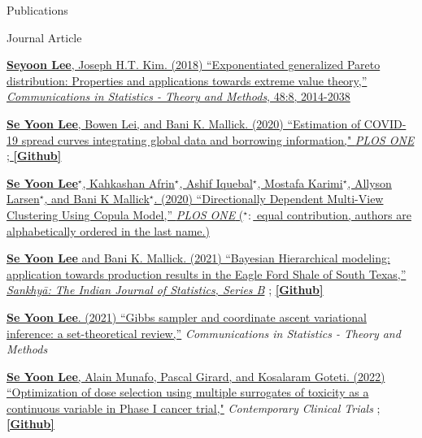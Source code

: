 \documentclass[
	11pt, %
]{resume} %
\begin{document}
\begin{rSection}{Publications}
\begin{rSubsection}{Journal Article}{}{}{}
\item[] [1] \href{https://www.tandfonline.com/doi/pdf/10.1080/03610926.2018.1441418?needAccess=true}
{\underline{\textbf{Seyoon Lee}}, Joseph H.T. Kim. (2018) ``Exponentiated generalized Pareto distribution:
Properties and applications towards extreme
value theory,''
\textit{Communications in Statistics - Theory and Methods},
 48:8, 2014-2038}
\item[] [2] \href{https://journals.plos.org/plosone/article?id=10.1371/journal.pone.0236860}
{\underline{\textbf{Se Yoon Lee}}, Bowen Lei, and Bani K. Mallick. (2020)
``Estimation of COVID-19 spread curves integrating global data and borrowing information," \textit{PLOS ONE}
;
\href{https://github.com/StevenBoys/BHRM}{\underline{\textbf{[Github]}}}
}
\item[] [3] 
\href{https://journals.plos.org/plosone/article?id=10.1371/journal.pone.0238996}
{\underline{\textbf{Se Yoon Lee}}$^\star$, Kahkashan Afrin$^\star$, Ashif Iquebal$^\star$, Mostafa Karimi$^\star$, Allyson Larsen$^\star$, and Bani K Mallick$^\star$. (2020)
``Directionally Dependent Multi-View Clustering Using Copula Model,'' \textit{PLOS ONE} ($^\star:$ equal contribution, authors are alphabetically ordered in the last name.)}
\item[] [4]
\href{https://rdcu.be/ceg4p}
{\underline{\textbf{Se Yoon Lee}} and Bani K. Mallick. (2021)
``Bayesian Hierarchical modeling: application towards
production results in the Eagle Ford Shale of South Texas,'' \textit{Sankhyā: The Indian Journal of Statistics, Series B}}
;
\href{https://github.com/yain22/SWM}{\underline{\textbf{[Github]}}}
\item[] [5]
\href{https://www.tandfonline.com/doi/full/10.1080/03610926.2021.1921214?src=}
{\underline{\textbf{Se Yoon Lee}}. (2021)
``Gibbs sampler and coordinate ascent variational inference: a set-theoretical review,''}
\textit{Communications in Statistics - Theory and Methods}
\item[][6]
\href{https://www.sciencedirect.com/science/article/pii/S1551714421003931}
{\underline{\textbf{Se Yoon Lee}}, Alain Munafo, Pascal Girard, and Kosalaram Goteti. (2022)
``Optimization of dose selection using multiple surrogates of toxicity as a continuous variable in Phase I cancer trial,"}
\textit{Contemporary Clinical Trials} 
;
\href{https://github.com/yain22/2PLD}{\underline{\textbf{[Github]}}}

\end{rSubsection}
\end{rSection}
\end{document}
